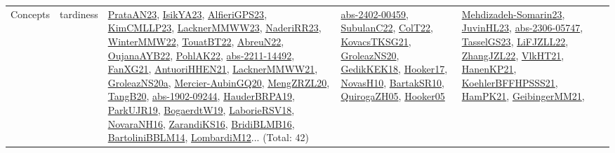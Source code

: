 {\begin{longtable}{lp{3cm}>{\raggedright}p{6cm}>{\raggedright}p{6cm}p{8cm}}
Concepts & tardiness & \href{articles/PrataAN23.pdf}{PrataAN23}\cite{PrataAN23}, \href{articles/IsikYA23.pdf}{IsikYA23}\cite{IsikYA23}, \href{articles/AlfieriGPS23.pdf}{AlfieriGPS23}\cite{AlfieriGPS23}, \href{papers/KimCMLLP23.pdf}{KimCMLLP23}\cite{KimCMLLP23}, \href{articles/LacknerMMWW23.pdf}{LacknerMMWW23}\cite{LacknerMMWW23}, \href{articles/NaderiRR23.pdf}{NaderiRR23}\cite{NaderiRR23}, \href{papers/WinterMMW22.pdf}{WinterMMW22}\cite{WinterMMW22}, \href{papers/TouatBT22.pdf}{TouatBT22}\cite{TouatBT22}, \href{articles/AbreuN22.pdf}{AbreuN22}\cite{AbreuN22}, \href{papers/OujanaAYB22.pdf}{OujanaAYB22}\cite{OujanaAYB22}, \href{articles/PohlAK22.pdf}{PohlAK22}\cite{PohlAK22}, \href{articles/abs-2211-14492.pdf}{abs-2211-14492}\cite{abs-2211-14492}, \href{articles/FanXG21.pdf}{FanXG21}\cite{FanXG21}, \href{papers/AntuoriHHEN21.pdf}{AntuoriHHEN21}\cite{AntuoriHHEN21}, \href{papers/LacknerMMWW21.pdf}{LacknerMMWW21}\cite{LacknerMMWW21}, \href{papers/GroleazNS20a.pdf}{GroleazNS20a}\cite{GroleazNS20a}, \href{papers/Mercier-AubinGQ20.pdf}{Mercier-AubinGQ20}\cite{Mercier-AubinGQ20}, \href{articles/MengZRZL20.pdf}{MengZRZL20}\cite{MengZRZL20}, \href{papers/TangB20.pdf}{TangB20}\cite{TangB20}, \href{articles/abs-1902-09244.pdf}{abs-1902-09244}\cite{abs-1902-09244}, \href{articles/HauderBRPA19.pdf}{HauderBRPA19}\cite{HauderBRPA19}, \href{papers/ParkUJR19.pdf}{ParkUJR19}\cite{ParkUJR19}, \href{papers/BogaerdtW19.pdf}{BogaerdtW19}\cite{BogaerdtW19}, \href{articles/LaborieRSV18.pdf}{LaborieRSV18}\cite{LaborieRSV18}, \href{articles/NovaraNH16.pdf}{NovaraNH16}\cite{NovaraNH16}, \href{articles/ZarandiKS16.pdf}{ZarandiKS16}\cite{ZarandiKS16}, \href{articles/BridiBLMB16.pdf}{BridiBLMB16}\cite{BridiBLMB16}, \href{papers/BartoliniBBLM14.pdf}{BartoliniBBLM14}\cite{BartoliniBBLM14}, \href{articles/LombardiM12.pdf}{LombardiM12}\cite{LombardiM12}... (Total: 42) & \href{articles/abs-2402-00459.pdf}{abs-2402-00459}\cite{abs-2402-00459}, \href{articles/SubulanC22.pdf}{SubulanC22}\cite{SubulanC22}, \href{articles/ColT22.pdf}{ColT22}\cite{ColT22}, \href{papers/KovacsTKSG21.pdf}{KovacsTKSG21}\cite{KovacsTKSG21}, \href{papers/GroleazNS20.pdf}{GroleazNS20}\cite{GroleazNS20}, \href{articles/GedikKEK18.pdf}{GedikKEK18}\cite{GedikKEK18}, \href{papers/Hooker17.pdf}{Hooker17}\cite{Hooker17}, \href{articles/NovasH10.pdf}{NovasH10}\cite{NovasH10}, \href{articles/BartakSR10.pdf}{BartakSR10}\cite{BartakSR10}, \href{papers/QuirogaZH05.pdf}{QuirogaZH05}\cite{QuirogaZH05}, \href{articles/Hooker05.pdf}{Hooker05}\cite{Hooker05} & \href{papers/Mehdizadeh-Somarin23.pdf}{Mehdizadeh-Somarin23}\cite{Mehdizadeh-Somarin23}, \href{papers/JuvinHL23.pdf}{JuvinHL23}\cite{JuvinHL23}, \href{articles/abs-2306-05747.pdf}{abs-2306-05747}\cite{abs-2306-05747}, \href{papers/TasselGS23.pdf}{TasselGS23}\cite{TasselGS23}, \href{papers/LiFJZLL22.pdf}{LiFJZLL22}\cite{LiFJZLL22}, \href{papers/ZhangJZL22.pdf}{ZhangJZL22}\cite{ZhangJZL22}, \href{articles/VlkHT21.pdf}{VlkHT21}\cite{VlkHT21}, \href{papers/HanenKP21.pdf}{HanenKP21}\cite{HanenKP21}, \href{articles/KoehlerBFFHPSSS21.pdf}{KoehlerBFFHPSSS21}\cite{KoehlerBFFHPSSS21}, \href{articles/HamPK21.pdf}{HamPK21}\cite{HamPK21}, \href{papers/GeibingerMM21.pdf}{GeibingerMM21}\cite{GeibingerMM21}, 
\end{longtable}}
